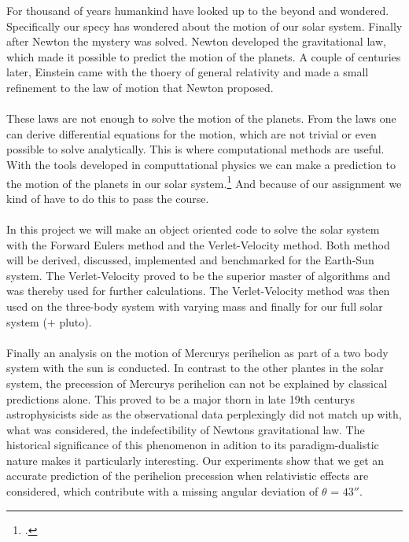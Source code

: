 For thousand of years humankind have looked up to the beyond and wondered. Specifically our specy has wondered about the motion of our solar system. Finally after Newton the mystery was solved. Newton developed the gravitational law, which made it possible to predict the motion of the planets. A couple of centuries later, Einstein came with the thoery of general relativity and made a small refinement to the law of motion that Newton proposed. 
\\
\\
These laws are not enough to solve the motion of the planets. From the laws one can derive differential equations for the motion, which are not trivial or even possible to solve analytically. This is where computational methods are useful. With the tools developed in computtational physics we can make a prediction to the motion of the planets in our solar system.\footnote{\href{http://www.uio.no/studier/emner/matnat/fys/FYS3150/h17/index.html}{\color{blue}{Semester page for FYS3150 - Autumn 2017}}.} And because of our assignment we kind of have to do this to pass the course.\cite{project3}
\\
\\
In this project we will make an object oriented code to solve the solar system with the Forward Eulers method and the Verlet-Velocity method. Both method will be derived, discussed, implemented and benchmarked for the Earth-Sun system. The Verlet-Velocity proved to be the superior master of algorithms and was thereby used for further calculations. The Verlet-Velocity method was then used on the three-body system with varying mass and finally for our full solar system (+ pluto).
\\
\\
Finally an analysis on the motion of Mercurys perihelion as part of a two body system with the sun is conducted. In contrast to the other plantes in the solar system, the precession of Mercurys perihelion can not be explained by classical predictions alone. This proved to be a major thorn in late 19th centurys astrophysicists side as the observational data perplexingly did not match up with, what was considered, the indefectibility of Newtons gravitational law. The historical significance of this phenomenon in adition to its paradigm-dualistic nature makes it particularly interesting. Our experiments show that we get an accurate prediction of the perihelion precession when relativistic effects are considered, which contribute with a missing angular deviation of $\theta$ = $43''$.